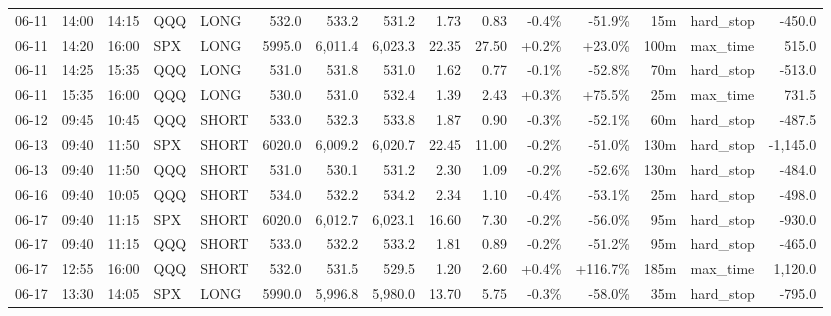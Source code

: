 \documentclass[11pt,a4paper,twoside]{article}
\begin{document}
\begin{landscape}
\begin{center}
\begin{longtable}{>{\color{txtmain}}l l l l l r r r r r r r r >{\color{txtmain}}l r}
06-11 & 14:00 & 14:15 & QQQ & LONG & 532.0 & 533.2 & 531.2 & 1.73 & 0.83 & \textcolor{lossred}{-0.4\%} & \textcolor{lossred}{-51.9\%} & 15m & hard\_stop & \textcolor{lossred}{-450.0} \\
06-11 & 14:20 & 16:00 & SPX & LONG & 5995.0 & 6,011.4 & 6,023.3 & 22.35 & 27.50 & \textcolor{wingreen}{+0.2\%} & \textcolor{wingreen}{+23.0\%} & 100m & max\_time & \textcolor{wingreen}{515.0} \\
06-11 & 14:25 & 15:35 & QQQ & LONG & 531.0 & 531.8 & 531.0 & 1.62 & 0.77 & \textcolor{lossred}{-0.1\%} & \textcolor{lossred}{-52.8\%} & 70m & hard\_stop & \textcolor{lossred}{-513.0} \\
06-11 & 15:35 & 16:00 & QQQ & LONG & 530.0 & 531.0 & 532.4 & 1.39 & 2.43 & \textcolor{wingreen}{+0.3\%} & \textcolor{wingreen}{+75.5\%} & 25m & max\_time & \textcolor{wingreen}{731.5} \\
06-12 & 09:45 & 10:45 & QQQ & SHORT & 533.0 & 532.3 & 533.8 & 1.87 & 0.90 & \textcolor{lossred}{-0.3\%} & \textcolor{lossred}{-52.1\%} & 60m & hard\_stop & \textcolor{lossred}{-487.5} \\
06-13 & 09:40 & 11:50 & SPX & SHORT & 6020.0 & 6,009.2 & 6,020.7 & 22.45 & 11.00 & \textcolor{lossred}{-0.2\%} & \textcolor{lossred}{-51.0\%} & 130m & hard\_stop & \textcolor{lossred}{-1,145.0} \\
06-13 & 09:40 & 11:50 & QQQ & SHORT & 531.0 & 530.1 & 531.2 & 2.30 & 1.09 & \textcolor{lossred}{-0.2\%} & \textcolor{lossred}{-52.6\%} & 130m & hard\_stop & \textcolor{lossred}{-484.0} \\
06-16 & 09:40 & 10:05 & QQQ & SHORT & 534.0 & 532.2 & 534.2 & 2.34 & 1.10 & \textcolor{lossred}{-0.4\%} & \textcolor{lossred}{-53.1\%} & 25m & hard\_stop & \textcolor{lossred}{-498.0} \\
06-17 & 09:40 & 11:15 & SPX & SHORT & 6020.0 & 6,012.7 & 6,023.1 & 16.60 & 7.30 & \textcolor{lossred}{-0.2\%} & \textcolor{lossred}{-56.0\%} & 95m & hard\_stop & \textcolor{lossred}{-930.0} \\
06-17 & 09:40 & 11:15 & QQQ & SHORT & 533.0 & 532.2 & 533.2 & 1.81 & 0.89 & \textcolor{lossred}{-0.2\%} & \textcolor{lossred}{-51.2\%} & 95m & hard\_stop & \textcolor{lossred}{-465.0} \\
06-17 & 12:55 & 16:00 & QQQ & SHORT & 532.0 & 531.5 & 529.5 & 1.20 & 2.60 & \textcolor{wingreen}{+0.4\%} & \textcolor{wingreen}{+116.7\%} & 185m & max\_time & \textcolor{wingreen}{1,120.0} \\
06-17 & 13:30 & 14:05 & SPX & LONG & 5990.0 & 5,996.8 & 5,980.0 & 13.70 & 5.75 & \textcolor{lossred}{-0.3\%} & \textcolor{lossred}{-58.0\%} & 35m & hard\_stop & \textcolor{lossred}{-795.0} \\

\end{longtable}
\end{center}
\end{landscape}
\end{document}
